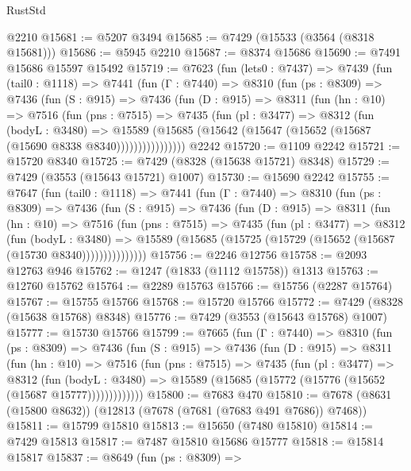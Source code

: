 \begin{lexlean}{RustStd}
\begin{coremodule}
    @2210
@15681 := @5207 @3494
@15685 := @7429 (@15533 (@3564 (@8318 @15681)))
@15686 := @5945 @2210
@15687 := @8374 @15686
@15690 := @7491 @15686 @15597 @15492
@15719 := @7623
    (fun (lets0 : @7437) =>
    @7439
      (fun (tail0 : @1118) =>
      @7441
        (fun (Γ : @7440) =>
        @8310
          (fun (ps : @8309) =>
          @7436
            (fun (S : @915) =>
            @7436
              (fun (D : @915) =>
              @8311
                (fun (hn : @10) =>
                @7516
                  (fun (pns : @7515) =>
                  @7435
                    (fun (pl : @3477) =>
                    @8312
                      (fun (bodyL : @3480) =>
                      @15589
                        (@15685 (@15642 (@15647 (@15652 (@15687 (@15690 @8338 @8340))))))))))))))))
    @2242
@15720 := @1109 @2242
@15721 := @15720 @8340
@15725 := @7429 (@8328 (@15638 @15721) @8348)
@15729 := @7429 (@3553 (@15643 @15721) @1007)
@15730 := @15690 @2242
@15755 := @7647
    (fun (tail0 : @1118) =>
    @7441
      (fun (Γ : @7440) =>
      @8310
        (fun (ps : @8309) =>
        @7436
          (fun (S : @915) =>
          @7436
            (fun (D : @915) =>
            @8311
              (fun (hn : @10) =>
              @7516
                (fun (pns : @7515) =>
                @7435
                  (fun (pl : @3477) =>
                  @8312
                    (fun (bodyL : @3480) =>
                    @15589 (@15685 (@15725 (@15729 (@15652 (@15687 (@15730 @8340)))))))))))))))
@15756 := @2246 @12756
@15758 := @2093 @12763 @946
@15762 := @1247 (@1833 (@1112 @15758)) @1313
@15763 := @12760 @15762
@15764 := @2289 @15763
@15766 := @15756 (@2287 @15764)
@15767 := @15755 @15766
@15768 := @15720 @15766
@15772 := @7429 (@8328 (@15638 @15768) @8348)
@15776 := @7429 (@3553 (@15643 @15768) @1007)
@15777 := @15730 @15766
@15799 := @7665
    (fun (Γ : @7440) =>
    @8310
      (fun (ps : @8309) =>
      @7436
        (fun (S : @915) =>
        @7436
          (fun (D : @915) =>
          @8311
            (fun (hn : @10) =>
            @7516
              (fun (pns : @7515) =>
              @7435
                (fun (pl : @3477) =>
                @8312
                  (fun (bodyL : @3480) =>
                  @15589 (@15685 (@15772 (@15776 (@15652 (@15687 @15777)))))))))))))
@15800 := @7683 @470
@15810 := @7678 (@8631 (@15800 @8632)) (@12813 (@7678 (@7681 (@7683 @491 @7686)) @7468))
@15811 := @15799 @15810
@15813 := @15650 (@7480 @15810)
@15814 := @7429 @15813
@15817 := @7487 @15810 @15686 @15777
@15818 := @15814 @15817
@15837 := @8649
    (fun (ps : @8309) =>

\end{coremodule}
\end{lexlean}
